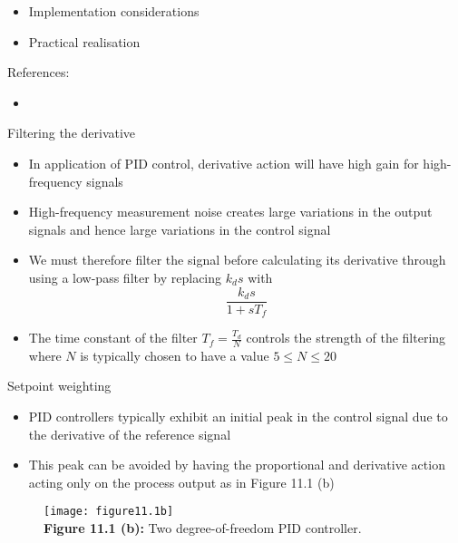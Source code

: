 \documentclass{beamer-control}
\begin{document}

\begin{SUMMARY}
\begin{itemize}
\item Implementation considerations
\item Practical realisation
\end{itemize}
\vfill References:
\begin{itemize}
\item {}
\end{itemize}
\end{SUMMARY}




\begin{frame}{Filtering the derivative}
\begin{itemize}
\item In application of PID control, derivative action will have high gain for high-frequency signals
\item High-frequency measurement noise creates large variations in the output signals and hence large variations in the control signal
\item We must therefore filter the signal before calculating its derivative through using a low-pass filter by replacing $k_d s$ with
\[\frac{k_d s}{1+sT_f}\]
\item The time constant of the filter $T_f=\tfrac{T_d}{N}$ controls the strength of the filtering where $N$ is typically chosen to have a value $5\leq N \leq 20 $
\end{itemize}
\end{frame}


\begin{frame}{Setpoint weighting}
	\begin{itemize}
		\item PID controllers typically exhibit an initial peak in the control signal due to the derivative of the reference signal
		\item This peak can be avoided by having the proportional and derivative action acting only on the process output as in Figure 11.1 (b)
	\end{itemize}
\begin{figure}
	\centering
	\texttt{[image: figure11.1b]}
	\\
	\textbf{Figure 11.1 (b):} Two degree-of-freedom PID controller. 
\end{figure}
\end{frame}
\end{document}

